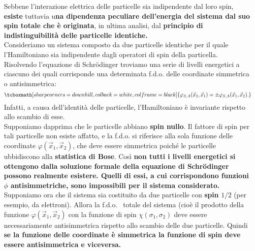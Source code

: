 Sebbene l'interazione elettrica delle particelle sia indipendente dal loro spin, \textbf{esiste} tuttavia u\textbf{na dipendenza peculiare dell'energia del sistema dal suo spin totale che è originata}, in ultima analisi, dal \textbf{principio di indistinguibilità delle particelle identiche.}\\

Consideriamo un sistema composto da due particelle identiche per il quale l'Hamiltoniano sia indipendente dagli operatori di spin della particella. Risolvendo l'equazione di Schr\"{o}dinger troviamo una serie di livelli energetici a ciascuno dei quali corrisponde una determinata f.d.o. delle coordinate simmetrica o antisimmetrica:
	\begin{equation}
		\tcboxmath[sharp corners=downhill, colback=white, colframe=black]{
			\varphi_{S,A}(\vec{x}_2,\vec{x}_1)= \pm \varphi_{S,A}(\vec{x}_1,\vec{x}_2) .
			}
	\end{equation}
Infatti, a causa dell'identità delle particelle, l'Hamiltoniano è invariante rispetto allo scambio di esse.\\

Supponiamo dapprima che le particelle abbiano \textbf{spin nullo}. Il fattore di spin per tali particelle non esiste affatto, e la f.d.o. si riferisce alla sola funzione delle coordinate $\varphi(\vec{x}_1, \vec{x}_2)$, che deve essere simmetrica poiché le particelle ubbidiscono alla \textbf{statistica di Bose}. Così \textbf{non tutti i livelli energetici si ottengono dalla soluzione formale della equazione di Schr\"{o}dinger possono realmente esistere. Quelli di essi, a cui corrispondono funzioni $\phi$ antisimmetriche, sono impossibili per il sistema considerato.}\\

Supponiamo ora che il sistema sia costituito da due particelle con \textbf{spin $1/2$} (per esempio, da elettroni). Allora la f.d.o.~ totale del sistema (cioè il prodotto della funzione $\varphi(\vec{x}_1,\vec{x}_2)$ con la funzione di spin $\chi(\sigma_1, \sigma_2)$ deve essere necessariamente antisimmetrica rispetto allo scambio delle due particelle. Quindi \textbf{se la funzione delle coordinate è simmetrica la funzione di spin deve essere antisimmetrica e viceversa.}\\

